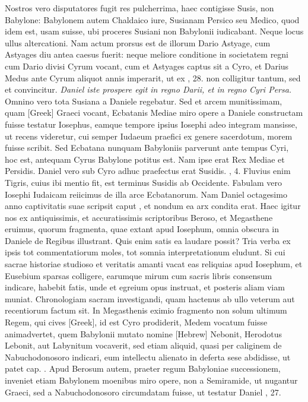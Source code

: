 Nostros vero disputatores fugit res pulcherrima,
 haec contigisse
Susis, non Babylone: Babylonem autem Chaldaico iure, Susianam
Persico seu Medico, quod idem est, usam suisse, ubi proceres Susiani
non Babylonii iudicabant.
Neque locus ullus altercationi.
Nam actum prorsus est de illorum Dario Astyage, cum Astyages diu antea
caesus fuerit: neque meliore conditione in societatem regni cum
Dario divisi Cyrum vocant, cum et Astyages captus sit a Cyro, et
Darius Medus ante Cyrum aliquot annis imperarit, ut ex , 28.
non colligitur tantum, sed et convincitur.
\textit{Daniel iste prospere egit in regno Darii,
 et in regno Cyri Persa.}
Omnino vero tota Susiana a Daniele regebatur.
Sed et arcem munitissimam, quam \textgreek{[Greek]}
Graeci vocant, Ecbatanis Mediae miro opere a Daniele constructam
fuisse testatur Iosephus, eamque tempore ipsius Iosephi adeo
integram mansisse, ut recens videretur, cui semper Iudaeum praefici
ex genere sacerdotum, morem fuisse scribit.
Sed Ecbatana nunquam
Babyloniis parverunt ante tempus Cyri, hoc est, antequam
Cyrus Babylone potitus est.
Nam ipse erat Rex Mediae et Persidis.
Daniel vero sub Cyro adhuc praefectus erat Susidis. , 4.
Fluvius
enim Tigris, cuius ibi mentio fit, est terminus Susidis ab Occidente.
Fabulam vero Iosephi Iudaicam reiicimus de illa arce Ecbatanorum.
Nam Daniel octagesimo anno captivitatis suae scripsit caput
, et nondum ea arx condita erat.
Haec igitur nos ex antiquissimis,
et accuratissimis scriptoribus Beroso, et Megasthene eruimus, quorum
fragmenta, quae extant apud Iosephum, omnia obscura in Daniele
de Regibus illustrant.
Quis enim satis ea laudare possit?
Tria verba ex ipsis tot commentatiorum moles,
 tot somnia interpretationum
eludunt.
Si cui sacrae historiae studioso et veritatis amanti
vacat eas reliquias apud Iosephum, et Eusebium sparsas colligere,
earumque mirum cum sacris libris consensum indicare, habebit
fatis, unde et egreium opus instruat, et posteris aliam viam
muniat.
Chronologiam sacram investigandi, quam hactenus
ab ullo veterum aut recentiorum factum sit.
In Megasthenis eximio fragmento non solum ultimum Regem, qui cives
 \textgreek{[Greek]}, id
est Cyro prodiderit, Medem vocatum fuisse animadvertet, quem
Babylonii mutato nomine \texthebrew{[Hebrew]} Nebonit, Herodotus Lebonit,
aut Labynitum vocaverit, sed etiam aliquid, quasi per caliginem
de Nabuchodonosoro indicari, eum intellectu alienato in deferta
sese abdidisse, ut patet cap. .
Apud Berosum autem, praeter
regum Babyloniae successionem, inveniet etiam Babylonem moenibus
miro opere, non a Semiramide, ut nugantur Graeci, sed a Nabuchodonosoro
circumdatam fuisse, ut testatur Daniel , 27.

